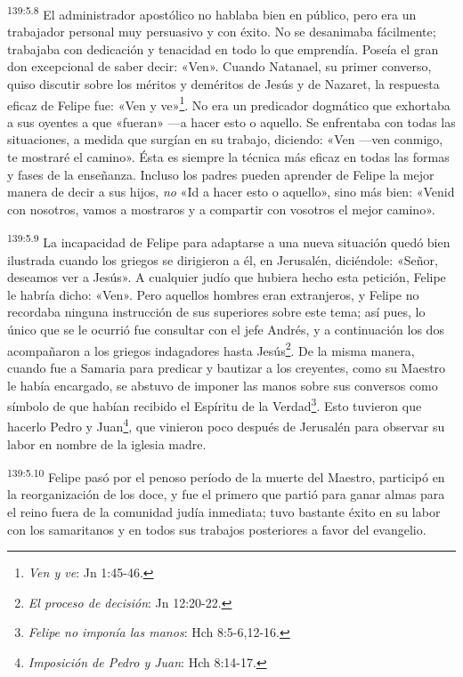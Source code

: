 \par
\textsuperscript{139:5.8} El administrador apostólico no hablaba bien en público, pero era un trabajador personal muy persuasivo y con éxito. No se desanimaba fácilmente; trabajaba con dedicación y tenacidad en todo lo que emprendía. Poseía el gran don excepcional de saber decir: «Ven». Cuando Natanael, su primer converso, quiso discutir sobre los méritos y deméritos de Jesús y de Nazaret, la respuesta eficaz de Felipe fue: «Ven y ve»\footnote{\textit{Ven y ve}: Jn 1:45-46.}. No era un predicador dogmático que exhortaba a sus oyentes a que «fueran» ---a hacer esto o aquello. Se enfrentaba con todas las situaciones, a medida que surgían en su trabajo, diciendo: «Ven ---ven conmigo, te mostraré el camino». Ésta es siempre la técnica más eficaz en todas las formas y fases de la enseñanza. Incluso los padres pueden aprender de Felipe la mejor manera de decir a sus hijos, \textit{no} «Id a hacer esto o aquello», sino más bien: «Venid con nosotros, vamos a mostraros y a compartir con vosotros el mejor camino».

\par
\textsuperscript{139:5.9} La incapacidad de Felipe para adaptarse a una nueva situación quedó bien ilustrada cuando los griegos se dirigieron a él, en Jerusalén, diciéndole: «Señor, deseamos ver a Jesús». A cualquier judío que hubiera hecho esta petición, Felipe le habría dicho: «Ven». Pero aquellos hombres eran extranjeros, y Felipe no recordaba ninguna instrucción de sus superiores sobre este tema; así pues, lo único que se le ocurrió fue consultar con el jefe Andrés, y a continuación los dos acompañaron a los griegos indagadores hasta Jesús\footnote{\textit{El proceso de decisión}: Jn 12:20-22.}. De la misma manera, cuando fue a Samaria para predicar y bautizar a los creyentes, como su Maestro le había encargado, se abstuvo de imponer las manos sobre sus conversos como símbolo de que habían recibido el Espíritu de la Verdad\footnote{\textit{Felipe no imponía las manos}: Hch 8:5-6,12-16.}. Esto tuvieron que hacerlo Pedro y Juan\footnote{\textit{Imposición de Pedro y Juan}: Hch 8:14-17.}, que vinieron poco después de Jerusalén para observar su labor en nombre de la iglesia madre.

\par
\textsuperscript{139:5.10} Felipe pasó por el penoso período de la muerte del Maestro, participó en la reorganización de los doce, y fue el primero que partió para ganar almas para el reino fuera de la comunidad judía inmediata; tuvo bastante éxito en su labor con los samaritanos y en todos sus trabajos posteriores a favor del evangelio.

